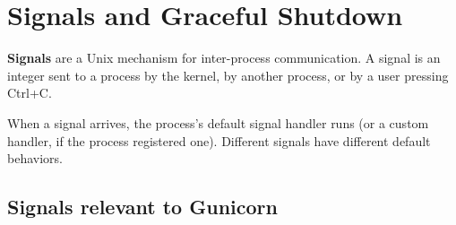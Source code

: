 \begin{codebox}[short]

\begin{Shaded}
\begin{Highlighting}[]
 


\NormalTok{ [}\NormalTok{, }\NormalTok{, }\NormalTok{, }\NormalTok{]}
\end{Highlighting}
\end{Shaded}

\end{codebox}

\setcounter{section}{3}
\section{Signals and Graceful Shutdown}\label{24-process-startup:244-signals-and-graceful-shutdown}

\textbf{Signals} are a Unix mechanism for inter-process communication. A signal is an integer sent to a process by the kernel, by another process, or by a user pressing Ctrl+C.

When a signal arrives, the process's default signal handler runs (or a custom handler, if the process registered one). Different signals have different default behaviors.


\subsection*{Signals relevant to Gunicorn}\label{24-process-startup:signals-relevant-to-gunicorn}

